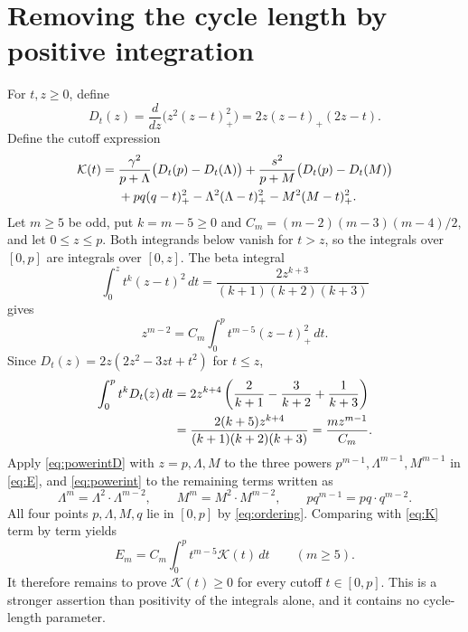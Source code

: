 \documentclass[11pt]{article}
\numberwithin{equation}{section}
\theoremstyle{remark}
\begin{document}
\section{Removing the cycle length by positive integration}
For $t,z\ge0$, define
\begin{equation}\label{eq:D}
 D_t(z)=\frac{d}{dz}\bigl(z^2(z-t)_+^2\bigr)
       =2z(z-t)_+(2z-t).
\end{equation}
Define the cutoff expression
\begin{align}\label{eq:K}
 \mathcal K(t)={}&
 \frac{\gamma^2}{p+\Lambda}\bigl(D_t(p)-D_t(\Lambda)\bigr)
 +\frac{s^2}{p+M}\bigl(D_t(p)-D_t(M)\bigr)\notag\\
 &+pq(q-t)_+^2-\Lambda^2(\Lambda-t)_+^2-M^2(M-t)_+^2.
\end{align}
Let $m\ge5$ be odd, put $k=m-5\ge0$ and $C_m=(m-2)(m-3)(m-4)/2$, and let $0\le z\le p$. Both integrands below vanish for $t>z$, so the integrals over $[0,p]$ are integrals over $[0,z]$. The beta integral
\[
 \int_0^z t^{k}(z-t)^2\,dt=\frac{2z^{k+3}}{(k+1)(k+2)(k+3)}
\]
gives
\begin{equation}\label{eq:powerint}
 z^{m-2}=C_m\int_0^p t^{m-5}(z-t)_+^2\,dt.
\end{equation}
Since $D_t(z)=2z(2z^2-3zt+t^2)$ for $t\le z$,
\begin{align}\label{eq:powerintD}
 \int_0^p t^{k}D_t(z)\,dt
 &=2z^{k+4}\left(\frac2{k+1}-\frac3{k+2}+\frac1{k+3}\right)\notag\\
 &=\frac{2(k+5)z^{k+4}}{(k+1)(k+2)(k+3)}
 =\frac{mz^{m-1}}{C_m}.
\end{align}
Apply \eqref{eq:powerintD} with $z=p,\Lambda,M$ to the three powers $p^{m-1},\Lambda^{m-1},M^{m-1}$ in \eqref{eq:E}, and \eqref{eq:powerint} to the remaining terms written as
\[
 \Lambda^m=\Lambda^2\cdot\Lambda^{m-2},\qquad
 M^m=M^2\cdot M^{m-2},\qquad
 pq^{m-1}=pq\cdot q^{m-2}.
\]
All four points $p,\Lambda,M,q$ lie in $[0,p]$ by \eqref{eq:ordering}. Comparing with \eqref{eq:K} term by term yields
\begin{equation}\label{eq:Eint}
 E_m=C_m\int_0^p t^{m-5}\mathcal K(t)\,dt
 \qquad(m\ge5).
\end{equation}
It therefore remains to prove $\mathcal K(t)\ge0$ for every cutoff $t\in[0,p]$. This is a stronger assertion than positivity of the integrals alone, and it contains no cycle-length parameter.
\end{document}
